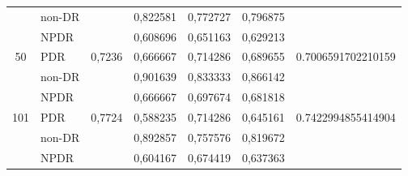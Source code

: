 \begin{table}[hbtp]
\begin{center}
\begin{tabular}{|c|l|c|l|l|l|c|}
                                  & non-DR                                             &                          & 0,822581                                          & 0,772727                                         & 0,796875                                        &                                      \\ \cline{2-2} \cline{4-6}
                                  & NPDR                                               &                          & 0,608696                                          & 0,651163                                         & 0,629213                                        &                                      \\ \cline{2-2} \cline{4-6}
            \multirow{-3}{*}{50}  & PDR                                                & \multirow{-3}{*}{0,7236} & 0,666667                                          & 0,714286                                         & 0,689655                                        & \multirow{-3}{*}{0.7006591702210159} \\ \hline
                                  & non-DR                                             &                          & 0,901639                                          & 0,833333                                         & 0,866142                                        &                                      \\ \cline{2-2} \cline{4-6}
                                  & NPDR                                               &                          & 0,666667                                          & 0,697674                                         & 0,681818                                        &                                      \\ \cline{2-2} \cline{4-6}
            \multirow{-3}{*}{101} & PDR                                                & \multirow{-3}{*}{0,7724} & 0,588235                                          & 0,714286                                         & 0,645161                                        & \multirow{-3}{*}{0.7422994855414904} \\ \hline
                                  & non-DR                                             &                          & 0,892857                                          & 0,757576                                         & 0,819672                                        &                                      \\ \cline{2-2} \cline{4-6}
                                  & NPDR                                               &                          & 0,604167                                          & 0,674419                                         & 0,637363                                        &                                      \\ \cline{2-2} \cline{4-6}

\end{tabular}
\end{center}
\end{table}
